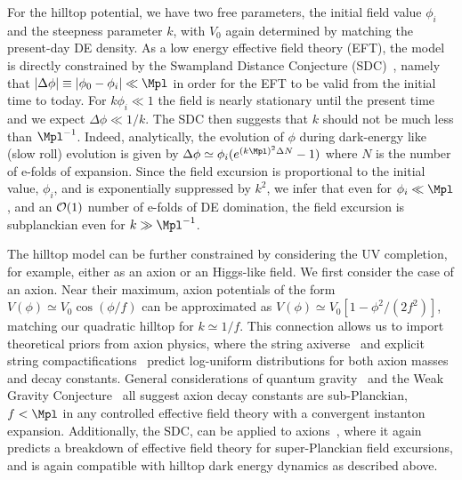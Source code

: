For the hilltop potential, we have two free parameters, the initial field value $\phi_i$ and the steepness parameter $k$, with $V_0$ again determined by matching the present-day DE density. As a low energy effective field theory (EFT), the model is directly constrained by the Swampland Distance Conjecture (SDC)~\cite{Ooguri:2006in}, namely that $|\Delta \phi|\equiv |\phi_0 - \phi_i| \ll \Mpl$ in order for the EFT to be valid from the initial time to today. For $k \phi_i \ll 1$ the field is nearly stationary until the present time and we expect $\Delta \phi \ll 1/k$. The SDC then suggests that $k$ should not be much less than $\Mpl^{-1}$.
Indeed, analytically, the evolution of $\phi$ during dark-energy like (slow roll) evolution is given by $\Delta \phi \simeq \phi_i(e^{(k \Mpl)^2 \Delta N}-1)$ where $N$ is the number of e-folds of expansion. Since the field excursion is proportional to the initial value, $\phi_i$, and is exponentially suppressed by $k^2$, we infer that even for $\phi_i \ll \Mpl$, and an ${\cal O}(1)$ number of e-folds of DE domination, the field excursion is subplanckian even for $k \gg \Mpl^{-1}$.


The hilltop model can be further constrained by considering the UV completion, for example, either as an axion or an Higgs-like field. We first consider the case of an axion. Near their maximum, axion potentials of the form $V(\phi) \simeq V_0\cos(\phi/f)$ can be approximated as $V(\phi) \simeq V_0\left[1 - \phi^2/(2f^2)\right]$, matching our quadratic hilltop for $k \simeq 1/f$. This connection allows us to import theoretical priors from axion physics, where the string axiverse~\cite{Arvanitaki:2009fg} and explicit string compactifications~\cite{Broeckel:2021dpz,Halverson:2019cmy,Mehta:2020kwu,Mehta:2021pwf,Demirtas:2021gsq} predict log-uniform distributions for both axion masses and decay constants. General considerations of quantum gravity~\cite{Montero:2015ofa,Kallosh:1995hi,Banks:2003sx} and the Weak Gravity Conjecture~\cite{Arkani-Hamed:2006emk, Harlow:2022ich} all suggest axion decay constants are sub-Planckian, $f<\Mpl$ in any controlled effective field theory with a convergent instanton expansion. Additionally, the SDC, can be applied to axions~\cite{Baume:2016psm,Klaewer:2016kiy,Blumenhagen:2017cxt,Scalisi:2018eaz}, where it again predicts a breakdown of effective field theory for super-Planckian field excursions, and is again compatible with hilltop dark energy dynamics as described above.

